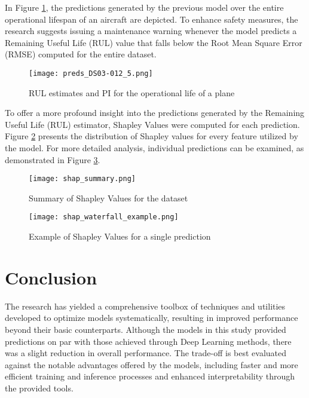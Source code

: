 \documentclass{IEEEtran}
\begin{document}
        In Figure \ref{fig:sample_estimates_pi}, the predictions generated by the previous model over the entire operational lifespan of an aircraft are depicted. To enhance safety measures, the research suggests issuing a maintenance warning whenever the model predicts a Remaining Useful Life (RUL) value that falls below the Root Mean Square Error (RMSE) computed for the entire dataset.
        \begin{figure}[!htbp]
            \centering
            \texttt{[image: preds\_DS03-012\_5.png]}
            \caption{RUL estimates and PI for the operational life of a plane}
            \label{fig:sample_estimates_pi}
        \end{figure}

        To offer a more profound insight into the predictions generated by the Remaining Useful Life (RUL) estimator, Shapley Values were computed for each prediction. Figure \ref{fig:shap_summary} presents the distribution of Shapley values for every feature utilized by the model. For more detailed analysis, individual predictions can be examined, as demonstrated in Figure \ref{fig:shap_instance}.
        \begin{figure}[H]
            \centering
            \texttt{[image: shap\_summary.png]}
            \caption{Summary of Shapley Values for the dataset}
            \label{fig:shap_summary}
        \end{figure}

        \begin{figure}[H]
            \centering
            \texttt{[image: shap\_waterfall\_example.png]}
            \caption{Example of Shapley Values for a single prediction}
            \label{fig:shap_instance}
        \end{figure}

    \section{Conclusion} \label{sec:conclusion}

        The research has yielded a comprehensive toolbox of techniques and utilities developed to optimize models systematically, resulting in improved performance beyond their basic counterparts. Although the models in this study provided predictions on par with those achieved through Deep Learning methods, there was a slight reduction in overall performance. The trade-off is best evaluated against the notable advantages offered by the models, including faster and more efficient training and inference processes and enhanced interpretability through the provided tools.
\end{document}
